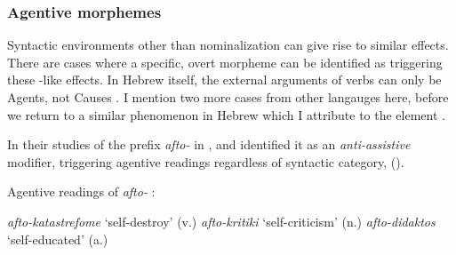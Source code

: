 \begin{exe}
\begin{xlist}
\begin{exe}
\begin{xlist}
\begin{exe}
\begin{xlist}
\begin{exe}
\begin{exe}
\begin{xlist}
\begin{exe}
\begin{xlist}
\begin{exe}
\begin{xlist}
\begin{exe}
\begin{xlist}
\begin{exe}
\begin{xlist}
\begin{exe}
\begin{xlist}
\begin{exe}
\begin{xlist}
\begin{exe}
\begin{xlist}
\begin{exe}
\begin{xlist}
\begin{exe}
\begin{xlist}
\begin{exe}
\begin{xlist}
\begin{exe}
\begin{xlist}
\begin{exe}
\begin{exe}
\begin{xlist}
\begin{exe}
\begin{xlist}
\begin{exe}
\begin{xlist}
\begin{exe}
\begin{xlist}
{\begin{exe}
\begin{xlist}
\begin{exe}
\begin{xlist}
\begin{exe}
\begin{xlist}
\begin{exe}
\begin{xlist}
\begin{xlist}
\begin{xlist}
\begin{exe}
\begin{xlist}
\begin{xlist}
\begin{xlist}
\begin{exe}
\begin{exe}
\begin{xlist}
\begin{exe}
\begin{xlist}
\begin{exe}
\begin{xlist}
\begin{exe}
\begin{xlist}
\begin{exe}
\begin{xlist}
\begin{exe}
\begin{xlist}
\begin{exe}
\begin{exe}
\begin{xlist}
\begin{xlist}
\begin{exe}
\begin{xlist}
		\subsubsection{Agentive morphemes}
Syntactic environments other than nominalization can give rise to similar effects. There are cases where a specific, overt morpheme can be identified as triggering these -like effects. In Hebrew itself, the external arguments of  verbs can only be Agents, not Causes \citep{doron03}. I mention two more cases from other langauges here, before we return to a similar phenomenon in Hebrew which I attribute to the element {\va}.

In their studies of the prefix \emph{afto-} in , \cite{alexiadouafto} and \cite{spathasetal15} identified it as an \emph{anti-assistive} modifier, triggering agentive readings regardless of syntactic category, (\nextx).
 \begin{exe}
 \ex  Agentive readings of \emph{afto-} \citep[61]{alexiadouafto}: 
 \begin{xlist} 
 	\ex  \emph{afto-katastrefome} `self-destroy' (v.) 
 	\ex   \emph{afto-kritiki} `self-criticism' (n.) 
 	\ex   \emph{afto-didaktos} `self-educated' (a.) 
 \z
\z 


\end{xlist}
\end{exe}
\end{xlist}
\end{exe}
\end{xlist}
\end{xlist}
\end{exe}
\end{exe}
\end{xlist}
\end{exe}
\end{xlist}
\end{exe}
\end{xlist}
\end{exe}
\end{xlist}
\end{exe}
\end{xlist}
\end{exe}
\end{xlist}
\end{exe}
\end{exe}
\end{xlist}
\end{xlist}
\end{xlist}
\end{exe}
\end{xlist}
\end{xlist}
\end{xlist}
\end{exe}
\end{xlist}
\end{exe}
\end{xlist}
\end{exe}
\end{xlist}
\end{exe}}
\end{xlist}
\end{exe}
\end{xlist}
\end{exe}
\end{xlist}
\end{exe}
\end{xlist}
\end{exe}
\end{exe}
\end{xlist}
\end{exe}
\end{xlist}
\end{exe}
\end{xlist}
\end{exe}
\end{xlist}
\end{exe}
\end{xlist}
\end{exe}
\end{xlist}
\end{exe}
\end{xlist}
\end{exe}
\end{xlist}
\end{exe}
\end{xlist}
\end{exe}
\end{xlist}
\end{exe}
\end{xlist}
\end{exe}
\end{xlist}
\end{exe}
\end{exe}
\end{xlist}
\end{exe}
\end{xlist}
\end{exe}
\end{xlist}
\end{exe}
